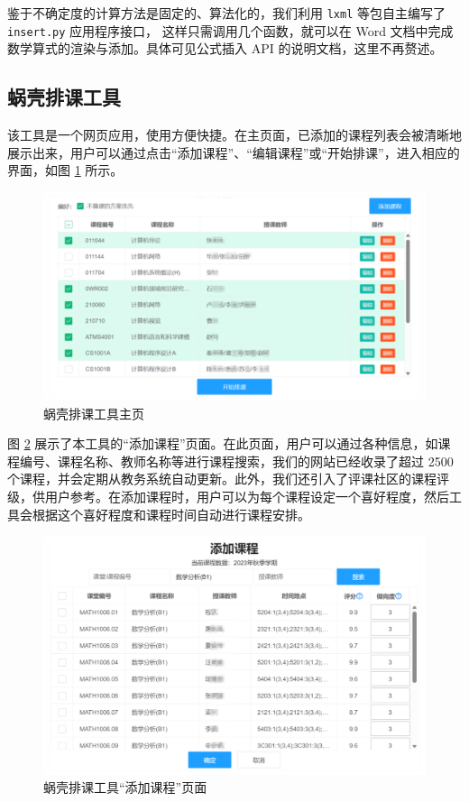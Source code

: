 鉴于不确定度的计算方法是固定的、算法化的，我们利用 \verb|lxml| 等包自主编写了 \verb|insert.py| 应用程序接口，
这样只需调用几个函数，就可以在 Word 文档中完成数学算式的渲染与添加。具体可见公式插入 API 的说明文档，这里不再赘述。

\subsection{蜗壳排课工具}

该工具是一个网页应用，使用方便快捷。在主页面，已添加的课程列表会被清晰地展示出来，用户可以通过点击“添加课程”、“编辑课程”或“开始排课”，进入相应的界面，如图 \ref{fig:p1} 所示。

\begin{figure}[htbp]
  \centering
  \includegraphics[width=\columnwidth]{figure/p1.png}
  \caption{蜗壳排课工具主页}
  \label{fig:p1}
\end{figure}

图 \ref{fig:p2} 展示了本工具的“添加课程”页面。在此页面，用户可以通过各种信息，如课程编号、课程名称、教师名称等进行课程搜索，我们的网站已经收录了超过 2500 个课程，并会定期从教务系统自动更新。此外，我们还引入了评课社区的课程评级，供用户参考。在添加课程时，用户可以为每个课程设定一个喜好程度，然后工具会根据这个喜好程度和课程时间自动进行课程安排。

\begin{figure}[htbp]
  \centering
  \includegraphics[width=\columnwidth]{figure/p2.png}
  \caption{蜗壳排课工具“添加课程”页面}
  \label{fig:p2}
\end{figure}

